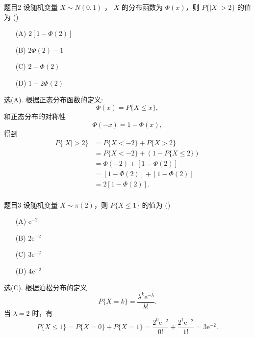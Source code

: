 \begin{question}{题目2}
    设随机变量 $X \sim N(0,1)$ ， $X$ 的分布函数为 $\Phi(x)$，则 $P\{|X|>2\}$ 的值为 (\quad \quad)
    \begin{multicols}{4}
        \begin{itemize}
            \item [(A)] $2[1 - \Phi(2)]$
            \item [(B)] $2\Phi(2) - 1$
            \item [(C)] $2 - \Phi(2)$
            \item [(D)] $1 - 2\Phi(2)$
        \end{itemize}
    \end{multicols}
\end{question}
\begin{solution}
    选(A).  根据正态分布函数的定义:
    $$
        \Phi(x) = P\{X \leqslant x\},
    $$
    和正态分布的对称性
    $$
        \Phi(-x) = 1 - \Phi(x),
    $$
    得到
    $$
        \begin{aligned}
            P\{|X|>2\}
             & = P\{X<-2\} + P\{X>2\}                 \\
             & = P\{X<-2\} + (1 - P\{X \leqslant 2\}) \\
             & = \Phi(-2) + [1 - \Phi(2)]             \\
             & = [1 - \Phi(2)] + [1 - \Phi(2)]        \\
             & = 2[1 - \Phi(2)].                      \\
        \end{aligned}
    $$
\end{solution}


\begin{question}{题目3}
    设随机变量 $X \sim \pi(2)$，则 $P\{X \leqslant 1\}$ 的值为 (\quad \quad)
    \begin{multicols}{4}
        \begin{itemize}
            \item [(A)] $\mathrm{e}^{-2}$
            \item [(B)] $2\mathrm{e}^{-2}$
            \item [(C)] $3\mathrm{e}^{-2}$
            \item [(D)] $4\mathrm{e}^{-2}$
        \end{itemize}
    \end{multicols}
\end{question}
\begin{solution}
    选(C). 根据泊松分布的定义
    $$
        P\{X=k\} = \frac{\lambda^k\mathrm{e}^{-\lambda}}{k!}.
    $$
    当 $\lambda = 2$ 时，有
    $$
        P\{X \leqslant 1\}
        = P\{X = 0\} + P\{X = 1\}
        = \frac{2^0 \mathrm{e}^{-2} }{0!} + \frac{2^1 \mathrm{e}^{-2} }{1!}
        = 3\mathrm{e}^{-2}.
    $$
\end{solution}



